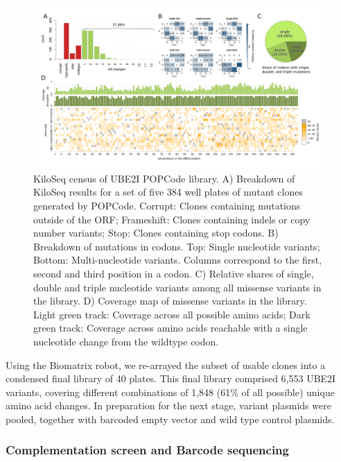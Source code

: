 \begin{landscape}
\begin{figure}[h]
	\centering
	\includegraphics[width=9in]{img/popcode_census.pdf}
	\caption{KiloSeq census of UBE2I POPCode library. A) Breakdown of KiloSeq results for a set of five 384 well plates of mutant clones generated by POPCode. Corrupt: Clones containing mutations outside of the ORF; Frameshift: Clones containing indels or copy number variants; Stop: Clones containing stop codons. B) Breakdown of mutations in codons. Top: Single nucleotide variants; Bottom: Multi-nucleotide variants. Columns correspond to the first, second and third position in a codon. C) Relative shares of single, double and triple nucleotide variants among all missense variants in the library. D) Coverage map of missense variants in the library. Light green track: Coverage across all possible amino acids; Dark green track: Coverage across amino acids reachable with a single nucleotide change from the wildtype codon.}
	\label{fig:popcode_census}
\end{figure}
\end{landscape}

Using the Biomatrix robot, we re-arrayed the subset of usable clones into a condensed final library of 40 plates. This final library comprised 6,553 UBE2I variants, covering different combinations of 1,848 (61\% of all possible) unique amino acid changes. In preparation for the next stage, variant plasmids were pooled, together with barcoded empty vector and wild type control plasmids.


\subsubsection{Complementation screen and Barcode sequencing}

